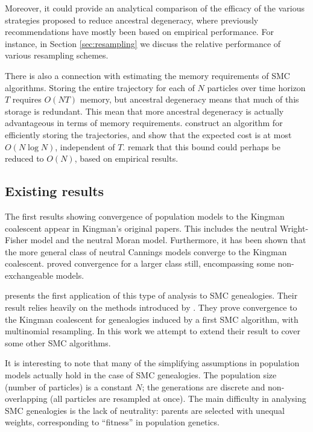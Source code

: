 \documentclass[fleqn]{article}
\theoremstyle{definition}
\begin{document}
Moreover, it could provide an analytical comparison of the efficacy of the various strategies proposed to reduce ancestral degeneracy, where previously recommendations have mostly been based on empirical performance. For instance, in Section \ref{sec:resampling} we discuss the relative performance of various resampling schemes.

There is also a connection with estimating the memory requirements of SMC algorithms. Storing the entire trajectory for each of $N$ particles over time horizon $T$ requires $O(NT)$ memory, but ancestral degeneracy means that much of this storage is redundant. 
This mean that more ancestral degeneracy is actually advantageous in terms of memory requirements.
\citet{jacob2015} construct an algorithm for efficiently storing the trajectories, and show that the expected cost is at most $O(N\log N)$, independent of $T$. \citet{koskela2018} remark that this bound could perhaps be reduced to $O(N)$, based on empirical results.

\subsection{Existing results}
The first results showing convergence of population models to the Kingman coalescent appear in Kingman's original papers. This includes the neutral Wright-Fisher model and the neutral Moran model.
Furthermore, it has been shown that the more general class of neutral Cannings models converge to the Kingman coalescent.
\citet{mohle1998} proved convergence for a larger class still, encompassing some non-exchangeable models.

\citet{koskela2018} presents the first application of this type of analysis to SMC genealogies. Their result relies heavily on the methods introduced by \citet{mohle1998}.
They prove convergence to the Kingman coalescent for genealogies induced by a first SMC algorithm, with multinomial resampling.
In this work we attempt to extend their result to cover some other SMC algorithms.

It is interesting to note that many of the simplifying assumptions in population models actually hold in the case of SMC genealogies. The population size (number of particles) is a constant $N$; the generations are discrete and non-overlapping (all particles are resampled at once). The main difficulty in analysing SMC genealogies is the lack of neutrality: parents are selected with unequal weights, corresponding to ``fitness'' in population genetics.
\end{document}
